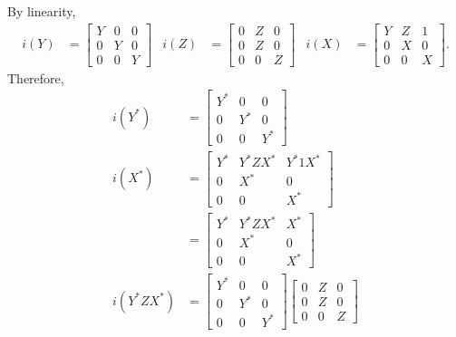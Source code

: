 \documentclass[a4paper,UKenglish,cleveref, autoref, thm-restate]{lipics-v2021}
\begin{document}
\begin{proofEnd}
  By linearity,
  \begin{align*}
    i(Y)
    & =
      \begin{bmatrix}
        Y & 0 & 0 \\
        0 & Y & 0 \\
        0 & 0 & Y
      \end{bmatrix}
    & i(Z)
    & =
      \begin{bmatrix}
        0 & Z & 0 \\
        0 & Z & 0 \\
        0 & 0 & Z
      \end{bmatrix}
    & i(X)
    & =
      \begin{bmatrix}
        Y & Z & 1 \\
        0 & X & 0 \\
        0 & 0 & X
      \end{bmatrix}.
  \end{align*}
  Therefore,
  \begin{align*}
    i(Y^*)
    & =
      \begin{bmatrix}
        Y^* & 0 & 0 \\
        0 & Y^* & 0 \\
        0 & 0 & Y^*
      \end{bmatrix}
    \\ i(X^*)
    & =
      \begin{bmatrix}
        Y^* & Y^*ZX^* & Y^*1X^* \\
        0 & X^* & 0 \\
        0 & 0 & X^*
      \end{bmatrix}
    \\ & =
      \begin{bmatrix}
        Y^* & Y^*ZX^* & X^* \\
        0 & X^* & 0 \\
        0 & 0 & X^*
      \end{bmatrix}
    \\ i(Y^*ZX^*)
    & =
      \begin{bmatrix}
        Y^* & 0 & 0 \\
        0 & Y^* & 0 \\
        0 & 0 & Y^*
      \end{bmatrix}
      \begin{bmatrix}
        0 & Z & 0 \\
        0 & Z & 0 \\
        0 & 0 & Z
      \end{bmatrix}

\end{align*}
\end{proofEnd}
\end{document}
